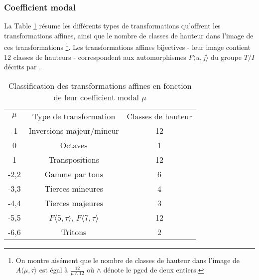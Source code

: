 \subsubsection{Coefficient modal}

La Table \ref{tab:classmu} résume les différents types de transformations qu'offrent les transformations affines, ainsi que le nombre de classes de hauteur dans l'image de ces transformations \footnote{On montre aisément que le nombre de classes de hauteur dans l'image de $A\langle \mu, \tau\rangle$ est égal à $\frac{12}{\mu\wedge 12}$ où $\wedge$ dénote le pgcd de deux entiers.}. Les transformations affines bijectives - leur image contient $12$ classes de hauteurs - correspondent  aux automorphismes $F\langle u,j \rangle$ du groupe $T/I$ décrits par \cite{lewin1990klumpenhouwer}.


\begin{table}[htbp]
  \centering
  \begin{tabular}{ccc}
    \rowcolor{gray!50}
    $\mu$ & Type de transformation & Classes de hauteur\\
    -1 & Inversions majeur/mineur & 12\\
    0 & Octaves & 1\\
    1 & Transpositions & 12 \\
    -2,2 & Gamme par tons & 6 \\
    -3,3 & Tierces mineures &4 \\
    -4,4 & Tierces majeures & 3\\
    -5,5 & $F\langle 5,\tau \rangle$, $F\langle 7,\tau \rangle$& 12 \\
    -6,6 & Tritons & 2\\
  \end{tabular}
  \caption{Classification des transformations affines en fonction de leur coefficient modal $\mu$\label{tab:classmu} } 
\end{table}